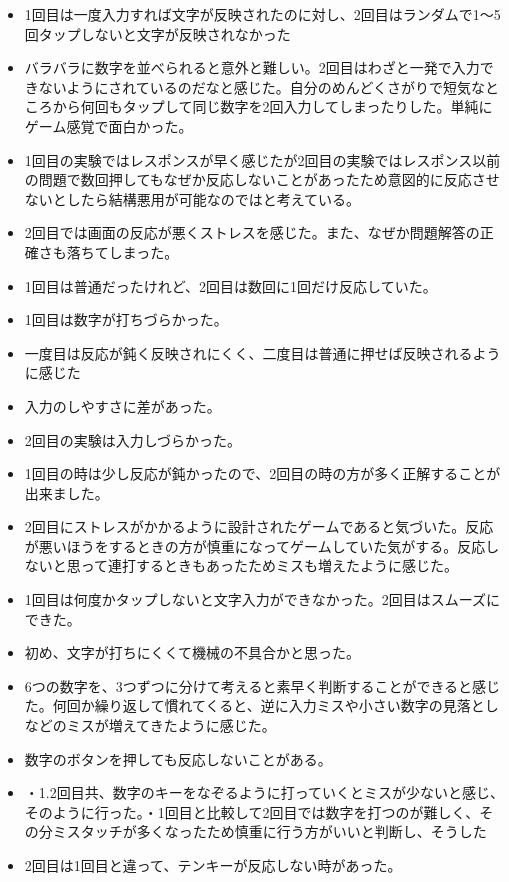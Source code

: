 \begin{itemize}
  \item 1回目は一度入力すれば文字が反映されたのに対し、2回目はランダムで1〜5回タップしないと文字が反映されなかった
  \item バラバラに数字を並べられると意外と難しい。2回目はわざと一発で入力できないようにされているのだなと感じた。自分のめんどくさがりで短気なところから何回もタップして同じ数字を2回入力してしまったりした。単純にゲーム感覚で面白かった。
  \item 1回目の実験ではレスポンスが早く感じたが2回目の実験ではレスポンス以前の問題で数回押してもなぜか反応しないことがあったため意図的に反応させないとしたら結構悪用が可能なのではと考えている。
  \item 2回目では画面の反応が悪くストレスを感じた。また、なぜか問題解答の正確さも落ちてしまった。
  \item 1回目は普通だったけれど、2回目は数回に1回だけ反応していた。
  \item 1回目は数字が打ちづらかった。
  \item 一度目は反応が鈍く反映されにくく、二度目は普通に押せば反映されるように感じた
  \item 入力のしやすさに差があった。
  \item 2回目の実験は入力しづらかった。
  \item 1回目の時は少し反応が鈍かったので、2回目の時の方が多く正解することが出来ました。
  \item 2回目にストレスがかかるように設計されたゲームであると気づいた。反応が悪いほうをするときの方が慎重になってゲームしていた気がする。反応しないと思って連打するときもあったためミスも増えたように感じた。
  \item 1回目は何度かタップしないと文字入力ができなかった。2回目はスムーズにできた。
  \item 初め、文字が打ちにくくて機械の不具合かと思った。
  \item 6つの数字を、3つずつに分けて考えると素早く判断することができると感じた。何回か繰り返して慣れてくると、逆に入力ミスや小さい数字の見落としなどのミスが増えてきたように感じた。
  \item 数字のボタンを押しても反応しないことがある。
  \item ・1.2回目共、数字のキーをなぞるように打っていくとミスが少ないと感じ、そのように行った。・1回目と比較して2回目では数字を打つのが難しく、その分ミスタッチが多くなったため慎重に行う方がいいと判断し、そうした
  \item 2回目は1回目と違って、テンキーが反応しない時があった。

\end{itemize}

